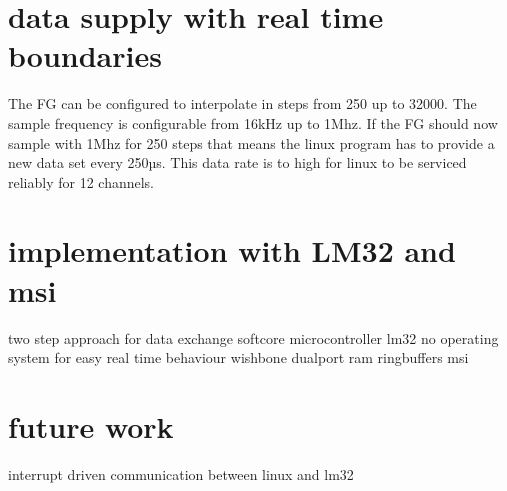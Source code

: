 \documentclass[a4paper,
              ]{jacow}
\begin{document}
\section{data supply with real time boundaries}
The FG can be configured to interpolate in steps from 250 up to 32000. The sample frequency is configurable from 16kHz up to 1Mhz. If the FG should now sample with 1Mhz for 250 steps
that means the linux program has to provide a new data set every 250µs. This data rate is to high for linux to be serviced reliably for 12 channels.

\section{implementation with LM32 and msi}
two step approach for data exchange
softcore microcontroller lm32
no operating system for easy real time behaviour
wishbone dualport ram
ringbuffers
msi


\section{future work}

\begin{Itemize}
  \item interrupt driven communication between linux and lm32
  \item
\end{Itemize}

%
%
\iftrue   %
	\newpage
	\raggedend
\fi


\iffalse  %
	\newpage
	\printbibliography

\else


\fi
\end{document}
